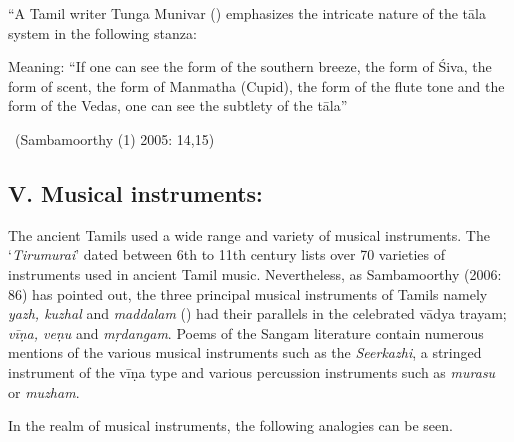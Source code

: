 \begin{myquote}
“A Tamil writer Tunga Munivar () emphasizes the intricate nature of the tāla system in the following stanza:
\end{myquote}

\begin{myquote}
\end{myquote}

\begin{myquote}
Meaning: “If one can see the form of the southern breeze, the form of Śiva, the form of scent, the form of Manmatha (Cupid), the form of the flute tone and the form of the Vedas, one can see the subtlety of the tāla”

~\hfill (Sambamoorthy (1) 2005: 14,15)
\end{myquote}


\subsection*{V. Musical instruments:}

The ancient Tamils used a wide range and variety of musical instruments. The ‘\textit{Tirumurai}’ dated between 6th to 11th century lists over 70 varieties of instruments used in ancient Tamil music. Nevertheless, as Sambamoorthy (2006: 86) has pointed out, the three principal musical instruments of Tamils namely \textit{yazh, kuzhal} and \textit{maddalam} () had their parallels in the celebrated vādya trayam; \textit{vīṇa, veṇu} and \textit{mṛdangam}. Poems of the Sangam literature contain numerous mentions of the various musical instruments such as the \textit{Seerkazhi}, a stringed instrument of the vīṇa type and various percussion instruments such as \textit{murasu} or \textit{muzham}.

In the realm of musical instruments, the following analogies can be seen.

